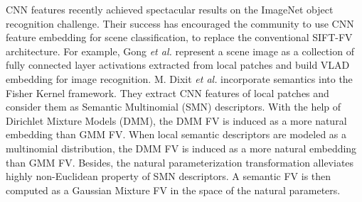 \documentclass[journal]{IEEEtran}
\begin{document}
CNN features recently achieved spectacular results on the ImageNet object recognition challenge. Their success has encouraged the community to use CNN feature embedding for scene classification, to replace the conventional SIFT-FV architecture. For example, Gong \emph{et al.} represent a scene image as a collection of fully connected layer activations extracted from local patches and build VLAD embedding for image recognition. M. Dixit \emph{et al.} incorporate semantics into the Fisher Kernel framework. They extract CNN features of local patches and consider them as Semantic Multinomial (SMN) descriptors. With the help of Dirichlet Mixture Models (DMM), the DMM FV is induced as a more natural embedding than GMM FV. When local semantic descriptors are modeled as a multinomial distribution, the DMM FV is induced as a more natural embedding than GMM FV. Besides, the natural parameterization transformation alleviates highly non-Euclidean property of SMN descriptors. A semantic FV is then computed as a Gaussian Mixture FV in the space of the natural parameters.
\end{document}
